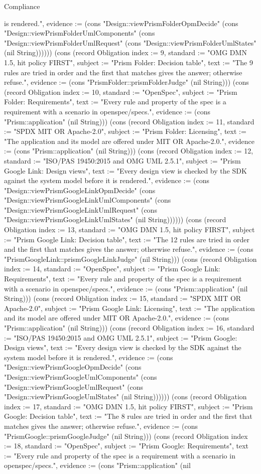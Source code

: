 \begin{lexlean}{Compliance}
\begin{semanticmodule}
{is rendered.", evidence := (cons "Design::viewPrismFolderOpmDecide" (cons "Design::viewPrismFolderUmlComponents" (cons "Design::viewPrismFolderUmlRequest" (cons "Design::viewPrismFolderUmlStates" (nil String)))))}) (cons (record Obligation {index := 9, standard := "OMG DMN 1.5, hit policy FIRST", subject := "Prism Folder: Decision table", text := "The 9 rules are tried in order and the first that matches gives the answer; otherwise refuse.", evidence := (cons "PrismFolder::prismFolderJudge" (nil String))}) (cons (record Obligation {index := 10, standard := "OpenSpec", subject := "Prism Folder: Requirements", text := "Every rule and property of the spec is a requirement with a scenario in openspec/specs.", evidence := (cons "Prism::application" (nil String))}) (cons (record Obligation {index := 11, standard := "SPDX MIT OR Apache-2.0", subject := "Prism Folder: Licensing", text := "The application and its model are offered under MIT OR Apache-2.0.", evidence := (cons "Prism::application" (nil String))}) (cons (record Obligation {index := 12, standard := "ISO/PAS 19450:2015 and OMG UML 2.5.1", subject := "Prism Google Link: Design views", text := "Every design view is checked by the SDK against the system model before it is rendered.", evidence := (cons "Design::viewPrismGoogleLinkOpmDecide" (cons "Design::viewPrismGoogleLinkUmlComponents" (cons "Design::viewPrismGoogleLinkUmlRequest" (cons "Design::viewPrismGoogleLinkUmlStates" (nil String)))))}) (cons (record Obligation {index := 13, standard := "OMG DMN 1.5, hit policy FIRST", subject := "Prism Google Link: Decision table", text := "The 12 rules are tried in order and the first that matches gives the answer; otherwise refuse.", evidence := (cons "PrismGoogleLink::prismGoogleLinkJudge" (nil String))}) (cons (record Obligation {index := 14, standard := "OpenSpec", subject := "Prism Google Link: Requirements", text := "Every rule and property of the spec is a requirement with a scenario in openspec/specs.", evidence := (cons "Prism::application" (nil String))}) (cons (record Obligation {index := 15, standard := "SPDX MIT OR Apache-2.0", subject := "Prism Google Link: Licensing", text := "The application and its model are offered under MIT OR Apache-2.0.", evidence := (cons "Prism::application" (nil String))}) (cons (record Obligation {index := 16, standard := "ISO/PAS 19450:2015 and OMG UML 2.5.1", subject := "Prism Google: Design views", text := "Every design view is checked by the SDK against the system model before it is rendered.", evidence := (cons "Design::viewPrismGoogleOpmDecide" (cons "Design::viewPrismGoogleUmlComponents" (cons "Design::viewPrismGoogleUmlRequest" (cons "Design::viewPrismGoogleUmlStates" (nil String)))))}) (cons (record Obligation {index := 17, standard := "OMG DMN 1.5, hit policy FIRST", subject := "Prism Google: Decision table", text := "The 8 rules are tried in order and the first that matches gives the answer; otherwise refuse.", evidence := (cons "PrismGoogle::prismGoogleJudge" (nil String))}) (cons (record Obligation {index := 18, standard := "OpenSpec", subject := "Prism Google: Requirements", text := "Every rule and property of the spec is a requirement with a scenario in openspec/specs.", evidence := (cons "Prism::application" (nil }
\end{semanticmodule}
\end{lexlean}
